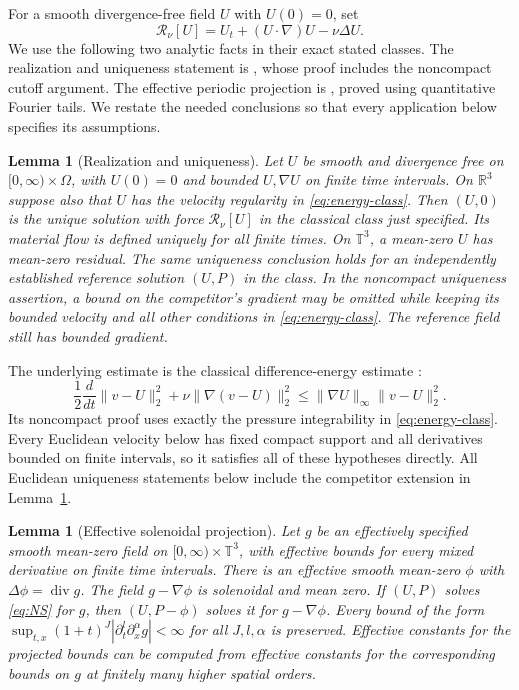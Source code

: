 \documentclass[11pt]{article}
\newtheorem{lemma}[theorem]{Lemma}
\theoremstyle{remark}
\newcommand{\R}{\mathbb R}
\newcommand{\T}{\mathbb T}
\DeclareMathOperator{\diver}{div}
\begin{document}
For a smooth divergence-free field $U$ with $U(0)=0$, set
\begin{equation}\label{eq:residual}
 \mathcal R_\nu[U]=U_t+(U\cdot\nabla)U-\nu\Delta U.
\end{equation}
We use the following two analytic facts in their exact stated classes.
The realization and uniqueness statement is
\cite[Lemma~3, Appendix~A.1]{CompanionA}, whose proof includes the
noncompact cutoff argument. The effective periodic projection is
\cite[Lemma~1]{CompanionA}, proved using quantitative Fourier tails.
We restate the needed conclusions so that every application below
specifies its assumptions.

\begin{lemma}[Realization and uniqueness]\label{lem:realization}
Let $U$ be smooth and divergence free on $[0,\infty)\times\Omega$,
with $U(0)=0$ and bounded $U,\nabla U$ on finite time intervals.
On $\R^3$ suppose also that $U$ has the velocity regularity in
\eqref{eq:energy-class}. Then $(U,0)$ is the unique solution with
force $\mathcal R_\nu[U]$ in the classical class just specified.
Its material flow is defined uniquely for all finite times.
On $\T^3$, a mean-zero $U$ has mean-zero residual.
The same uniqueness conclusion holds for an independently established
reference solution $(U,P)$ in the class.
In the noncompact uniqueness assertion, a bound on the competitor's
gradient may be omitted while keeping its bounded velocity and all
other conditions in \eqref{eq:energy-class}. The reference field still
has bounded gradient.
\end{lemma}

The underlying estimate is the classical difference-energy estimate
\cite[Section~18]{Leray}:
\[
 \frac12\frac{d}{dt}\|v-U\|_2^2+\nu\|\nabla(v-U)\|_2^2
 \leq\|\nabla U\|_\infty\|v-U\|_2^2.
\]
Its noncompact proof uses exactly the pressure integrability in
\eqref{eq:energy-class}. Every Euclidean velocity below has fixed compact
support and all derivatives bounded on finite intervals, so it satisfies
all of these hypotheses directly.
All Euclidean uniqueness statements below include the competitor
extension in Lemma~\ref{lem:realization}.

\begin{lemma}[Effective solenoidal projection]\label{lem:projection}
Let $g$ be an effectively specified smooth mean-zero field on
$[0,\infty)\times\T^3$, with effective bounds for every mixed derivative
on finite time intervals. There is an effective smooth mean-zero $\phi$
with $\Delta\phi=\diver g$. The field $g-\nabla\phi$ is solenoidal
and mean zero. If $(U,P)$ solves \eqref{eq:NS} for $g$, then
$(U,P-\phi)$ solves it for $g-\nabla\phi$.
Every bound of the form
$\sup_{t,x}(1+t)^J|\partial_t^l\partial_x^\alpha g|<\infty$
for all $J,l,\alpha$ is preserved. Effective constants for the projected
bounds can be computed from effective constants for the corresponding
bounds on $g$ at finitely many higher spatial orders.
\end{lemma}
\end{document}
